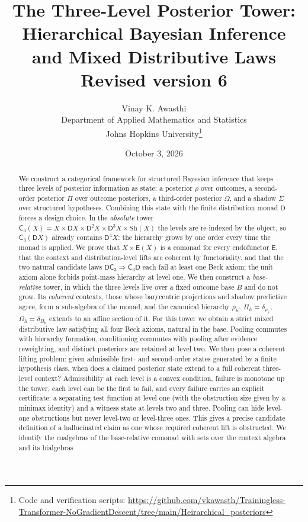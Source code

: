 \documentclass[11pt]{article}
\title{The Three-Level Posterior Tower:\\
Hierarchical Bayesian Inference and Mixed Distributive Laws\\[4pt]
\large Revised version 6}
\author{Vinay K. Awasthi\\
Department of Applied Mathematics and Statistics\\
Johns Hopkins University\thanks{Code and verification scripts:
\url{https://github.com/vkawasth/Trainingless-Transformer-NoGradientDescent/tree/main/Heirarchical_posteriors}}}
\date{October 3, 2026}
\theoremstyle{definition}
\theoremstyle{remark}
\newcommand{\D}{\mathsf{D}}
\newcommand{\Sh}{\mathrm{Sh}}
\newcommand{\C}{\mathsf{C}}
\newcommand{\E}{\mathsf{E}}
\begin{document}
\maketitle

\begin{abstract}
We construct a categorical framework for structured Bayesian inference that keeps three levels of
posterior information as state: a posterior $\rho$ over outcomes, a second-order posterior $\Pi$ over
outcome posteriors, a third-order posterior $\Omega$, and a shadow $\Sigma$ over structured hypotheses.
Combining this state with the finite distribution monad $\D$ forces a design choice. In the
\emph{absolute} tower $\C_3(X)=X\times\D X\times\D^2X\times\D^3X\times\Sh(X)$ the levels are
re-indexed by the object, so $\C_3(\D X)$ already contains $\D^4X$: the hierarchy grows by one order
every time the monad is applied. We prove that $X\times\E(X)$ is a comonad for every endofunctor $\E$,
that the context and distribution-level lifts are coherent by functoriality, and that the two natural
candidate laws $\D\C_3\Rightarrow\C_3\D$ each fail at least one Beck axiom; the unit axiom alone forbids
point-mass hierarchy at level one. We then construct a \emph{base-relative} tower, in which the three
levels live over a fixed outcome base $B$ and do not grow. Its \emph{coherent} contexts, those whose
barycentric projections and shadow predictive agree, form a sub-algebra of the monad, and the
canonical hierarchy $\rho_h$, $\Pi_h=\delta_{\rho_h}$, $\Omega_h=\delta_{\Pi_h}$ extends to an affine
section of it. For this tower we obtain a strict mixed distributive law satisfying all four Beck
axioms, natural in the base. Pooling commutes with hierarchy formation, conditioning commutes with
pooling after evidence reweighting, and distinct posteriors are retained at level two. We then pose a coherent lifting problem: given
admissible first- and second-order states generated by a finite hypothesis class, when does a claimed
posterior state extend to a full coherent three-level context? Admissibility at each level is a
convex condition, failure is monotone up the tower, each level can be the first to fail, and every
failure carries an explicit certificate: a separating test function at level one (with the obstruction
size given by a minimax identity) and a witness state at levels two and three. Pooling can hide
level-one obstructions but never level-two or level-three ones. This gives a precise candidate
definition of a hallucinated claim as one whose required coherent lift is obstructed. We identify
the coalgebras of the base-relative comonad with sets over the context algebra and its bialgebras

\end{abstract}
\end{document}
